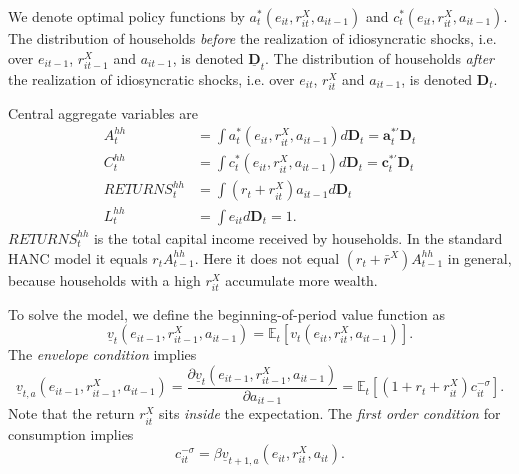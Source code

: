 \documentclass[12pt,english]{article}
\begin{document}
We denote optimal policy functions by $a^{\ast}_{t}(e_{it},r^{X}_{it},a_{it-1})$
and $c^{\ast}_{t}(e_{it},r^{X}_{it},a_{it-1})$. The distribution
of households \emph{before} the realization of idiosyncratic shocks,
i.e. over $e_{it-1}$, $r^{X}_{it-1}$ and $a_{it-1}$, is denoted
$\underline{\boldsymbol{D}}_{t}$. The distribution of households
\emph{after} the realization of idiosyncratic shocks, i.e. over $e_{it}$,
$r^{X}_{it}$ and $a_{it-1}$, is denoted $\boldsymbol{D}_{t}$.

Central aggregate variables are
\begin{align}
A^{hh}_{t} & =\int a^{\ast}_{t}(e_{it},r^{X}_{it},a_{it-1})d\boldsymbol{D}_{t}=\boldsymbol{a}^{\ast\prime}_{t}\boldsymbol{D}_{t}\label{eq:A_hh}\\
C^{hh}_{t} & =\int c^{\ast}_{t}(e_{it},r^{X}_{it},a_{it-1})d\boldsymbol{D}_{t}=\boldsymbol{c}^{\ast\prime}_{t}\boldsymbol{D}_{t}\label{eq:C_hh}\\
RETURNS^{hh}_{t} & =\int(r_{t}+r^{X}_{it})a_{it-1}d\boldsymbol{D}_{t}\label{eq:RETURNS_hh}\\
L^{hh}_{t} & =\int e_{it}d\boldsymbol{D}_{t}=1.\label{eq:L_hh}
\end{align}
$RETURNS^{hh}_{t}$ is the total capital income received by households.
In the standard HANC model it equals $r_{t}A^{hh}_{t-1}$. Here it
does not equal $(r_{t}+\bar{r}^{X})A^{hh}_{t-1}$ in general, because
households with a high $r^{X}_{it}$ accumulate more wealth.

To solve the model, we define the beginning-of-period value function
as
\begin{equation}
\underline{v}_{t}\left(e_{it-1},r^{X}_{it-1},a_{it-1}\right)=\mathbb{E}_{t}\left[v_{t}(e_{it},r^{X}_{it},a_{it-1})\right].\label{eq:beginning-of-period-v}
\end{equation}
The \emph{envelope condition} implies
\begin{equation}
\underline{v}_{t,a}(e_{it-1},r^{X}_{it-1},a_{it-1})=\frac{\partial\underline{v}_{t}(e_{it-1},r^{X}_{it-1},a_{it-1})}{\partial a_{it-1}}=\mathbb{E}_{t}\left[(1+r_{t}+r^{X}_{it})c^{-\sigma}_{it}\right].\label{eq:Envelope}
\end{equation}
Note that the return $r^{X}_{it}$ sits \emph{inside} the expectation.
The \emph{first order condition} for consumption implies
\begin{equation}
c^{-\sigma}_{it}=\beta\underline{v}_{t+1,a}(e_{it},r^{X}_{it},a_{it}).\label{eq:FOC}
\end{equation}
\end{document}
